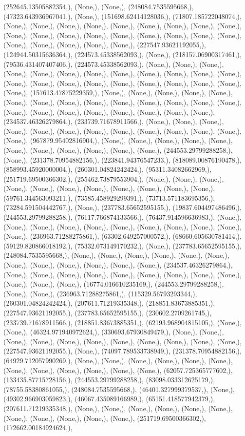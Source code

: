 \documentclass{article}
\begin{document}
(252645.13505882354,), (None,), (None,), (248084.7535595668,), (47323.643936967041,), (None,), (151698.62414128036,), (71807.185722048074,), (None,), (None,), (None,), (None,), (None,), (None,), (None,), (None,), (None,), (None,), (None,), (None,), (None,), (None,), (None,), (None,), (None,), (None,), (None,), (None,), (None,), (None,), (None,), (227547.93621192055,), (124944.50315636364,), (224573.45338562093,), (None,), (218157.06900317461,), (79536.431407407406,), (224573.45338562093,), (None,), (None,), (None,), (None,), (None,), (None,), (None,), (None,), (None,), (None,), (None,), (None,), (None,), (None,), (None,), (None,), (None,), (None,), (None,), (None,), (None,), (None,), (157613.47875229359,), (None,), (None,), (None,), (None,), (None,), (None,), (None,), (None,), (None,), (None,), (None,), (None,), (None,), (None,), (None,), (None,), (None,), (None,), (None,), (None,), (None,), (None,), (234537.46326279864,), (233739.71678911566,), (None,), (None,), (None,), (None,), (None,), (None,), (None,), (None,), (None,), (None,), (None,), (None,), (None,), (967879.95402816904,), (None,), (None,), (None,), (None,), (None,), (None,), (None,), (None,), (None,), (None,), (None,), (244553.29799288258,), (None,), (231378.70954882156,), (223841.94376547233,), (818089.00876190478,), (858993.45920000004,), (260301.04824242424,), (95311.34082662969,), (251719.69500366302,), (255462.73879553904,), (None,), (None,), (None,), (None,), (None,), (None,), (None,), (None,), (None,), (None,), (None,), (59761.344563093211,), (73585.458929299391,), (73713.571183695356,), (73284.591504442767,), (None,), (237783.65652595155,), (19837.604497486496,), (244553.29799288258,), (76117.766874133566,), (76437.914596636983,), (None,), (None,), (None,), (None,), (None,), (None,), (None,), (None,), (None,), (None,), (None,), (236963.71288275861,), (63302.649257000572,), (68660.605630781414,), (59129.820866018192,), (75332.073149170232,), (None,), (237783.65652595155,), (248084.7535595668,), (None,), (None,), (None,), (None,), (None,), (None,), (None,), (None,), (None,), (None,), (None,), (None,), (234537.46326279864,), (None,), (None,), (None,), (None,), (None,), (None,), (None,), (None,), (None,), (None,), (None,), (None,), (16774.016610235169,), (244553.29799288258,), (None,), (None,), (236963.71288275861,), (115329.56793293344,), (260301.04824242424,), (207611.71219335348,), (218851.83673885351,), (227547.93621192055,), (237783.65652595155,), (230602.2709261745,), (233739.71678911566,), (218851.83673885351,), (62193.968904815105,), (None,), (None,), (46324.971940972624,), (330693.67930849479,), (None,), (None,), (None,), (None,), (None,), (None,), (None,), (None,), (None,), (None,), (None,), (227547.93621192055,), (None,), (74097.789533738949,), (231378.70954882156,), (64929.712057990269,), (None,), (None,), (None,), (None,), (None,), (None,), (None,), (None,), (None,), (None,), (None,), (None,), (62057.725365777602,), (133435.87715728156,), (244553.29799288258,), (83098.033312625179,), (78755.58380861055,), (248084.7535595668,), (46401.327999379537,), (None,), (49302.966903059823,), (46067.435089166989,), (65151.418577942379,), (207611.71219335348,), (None,), (None,), (None,), (None,), (None,), (None,), (None,), (None,), (None,), (None,), (None,), (251719.69500366302,), (172662.00184924624,), 
\end{document}
